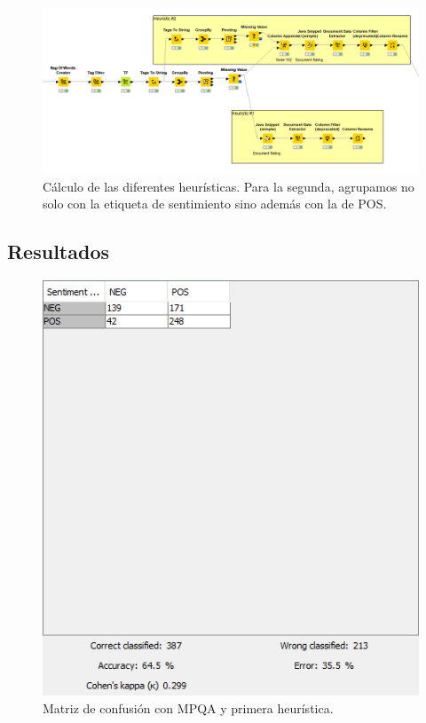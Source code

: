 \begin{figure}[H]
    \center\includegraphics[width=.95\linewidth]{img/analysis/heuristic.png}
    \caption{Cálculo de las diferentes heurísticas. Para la segunda, agrupamos no solo con la etiqueta de sentimiento sino además con la de POS.}
\end{figure}


\subsection{Resultados}

\begin{figure}[H]
    \center\includegraphics[width=.95\linewidth]{img/analysis/score1.png}
    \caption{Matriz de confusión con MPQA y primera heurística.}
\end{figure}


